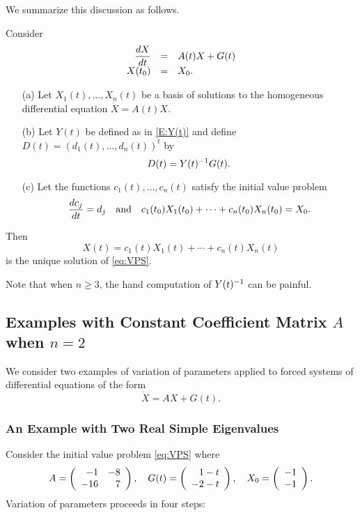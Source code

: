 \documentclass{ximera}
\begin{document}
We summarize this discussion as follows. 
\begin{theorem} \label{thm:varparsys}
Consider 
\begin{equation}  \label{eq:VPS}
\begin{array}{rcl}
\displaystyle \frac{dX}{dt} & = & A(t)X+G(t)\\
X(t_0) & = & X_0.
\end{array}
\end{equation}
\begin{itemize}
\item[(a)]  Let $X_1(t),\ldots,X_n(t)$ be a 
basis of solutions to 
the homogeneous differential equation $\dot{X}=A(t)X$.  
\item[(b)]  Let $Y(t)$ be defined as in \eqref{E:Y(t)} and define 
$D(t)=(d_1(t),\ldots,d_n(t))^t$ by 
\begin{equation}  \label{e:D(t)}
D(t) = Y(t)^{-1} G(t).
\end{equation}
\item[(c)]  Let the functions $c_1(t),\ldots,c_n(t)$ satisfy the initial 
value problem 
\begin{equation}  \label{eq:cj0}
\frac{dc_j}{dt}=d_j \quad\mbox{and}\quad  c_1(t_0)X_1(t_0) + \cdots +c_n(t_0)X_n(t_0) = X_0.
\end{equation}
\end{itemize}
Then
\[
X(t) =  c_1(t)X_1(t) + \cdots + c_n(t)X_n(t)
\]
is the unique solution of \eqref{eq:VPS}.
\end{theorem}

Note that when $n\ge 3$, the hand computation of $Y(t)^{-1}$ can be  
painful.

\subsection*{Examples with Constant Coefficient Matrix $A$ when $n=2$}

We consider two examples of variation of parameters applied to 
forced systems of differential equations of the form 
\[
\dot{X} = AX + G(t).
\]

\subsubsection*{An Example with Two Real Simple Eigenvalues}

Consider the initial value problem \eqref{eq:VPS} where
\begin{equation}  \label{eq:exinhom2}
A=\left(\begin{array}{rr} -1 & -8\\ -16 &7\end{array}\right), \quad G(t)= \left(\begin{array}{r} 1-t \\ -2-t\end{array}\right), \quad 
X_0 =  \left(\begin{array}{r} -1 \\ -1\end{array}\right).
\end{equation}
Variation of parameters proceeds in four steps:
\end{document}
